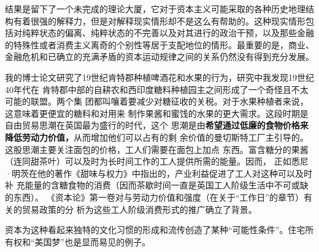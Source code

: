 结果是留下了一个未完成的理论大厦，它对于资本主义可能采取的各种历史地理结构有着很强的解释力，但是对解释现实情形却不是这么有帮助的。这种现实情形包括对纯粹状态的偏离、纯粹状态的不完善以及对其进行的政治干预，以及那些金融的特殊性或者消费主义离奇的个别性等居于支配地位的情形。最重要的是，商业、金融危机和已确立的充满矛盾的资本运动规律之间的关系仍然没有得到充分发展。

我的博士论文研究了19世纪肯特郡种植啤酒花和水果的行为，研究中我发现19世纪40年代在
肯特郡中部的自耕农和西印度糖料种植园主之间形成了一个奇怪且不太可能的联盟。两个集
团都叫嚷着要减少对糖征收的关税。对于水果种植者来说，这意味着更便宜的糖料和对用来
制作果酱和蜜饯的水果的更大需求。这段时期是自由贸易思潮在英国最为盛行的时代，这个
思潮是由\textbf{希望通过低廉的食物价格来降低劳动力价值，}从而增加他们可以占有的剩
余价值的曼切斯特工厂主引导的。这股思潮主要关注面包的价格，工人们需要在面包上加点
东西。富含糖分的果酱（连同甜茶叶）可以及时为长时间工作的工人提供所需的能量。因而，
正如悉尼·明茨在他的著作《甜味与权力》中指出的，产业利益促进了工人对这种可以及时补
充能量的含糖食物的消费（因而茶歇时间一直是英国工人阶级生活中不可或缺的东西）。
《资本论》第一卷对与劳动力价值和强度（在关于“工作日”的章节）有关的贸易政策的分
析为这些工人阶级消费形式的推广确立了背景。

资本为这种看起来独特的文化习惯的形成和流传创造了某种“可能性条件”。住宅所有权和“美国梦”也是显而易见的例子。



















